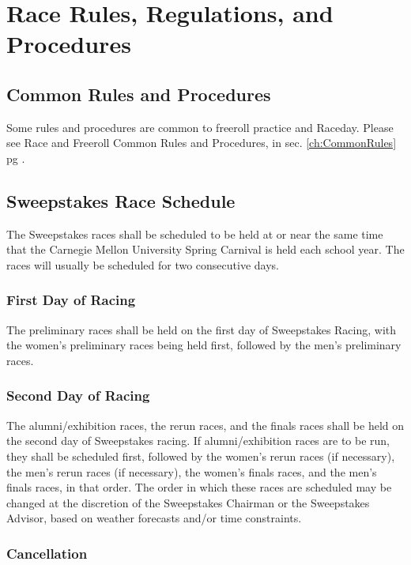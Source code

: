 \chapter{Race Rules, Regulations, and Procedures}
\label{ch:RaceRules}

\section{Common Rules and Procedures}
	Some rules and procedures are common to freeroll practice and Raceday. 
	Please see Race and Freeroll Common Rules and Procedures, in sec. \ref{ch:CommonRules} pg \pageref{ch:CommonRules}.

\section{Sweepstakes Race Schedule}

	The Sweepstakes races shall be scheduled to be held at or near the same time
	that the Carnegie Mellon University Spring Carnival is held each school year.
	The races will usually be scheduled for two consecutive days.

\subsection{First Day of Racing}

	The preliminary races shall be held on the first day of Sweepstakes Racing,
	with the women's preliminary races being held first, followed by the men's
	preliminary races.

\subsection{Second Day of Racing}

	The alumni/exhibition races, the rerun races, and the finals races shall be
	held on the second day of Sweepstakes racing. If alumni/exhibition races are to
	be run, they shall be scheduled first, followed by the women's rerun races (if
	necessary), the men's rerun races (if necessary), the women's finals races, and
	the men's finals races, in that order. The order in which these races are
	scheduled may be changed at the discretion of the Sweepstakes Chairman or the
	Sweepstakes Advisor, based on weather forecasts and/or time constraints.

\subsection{Cancellation}

